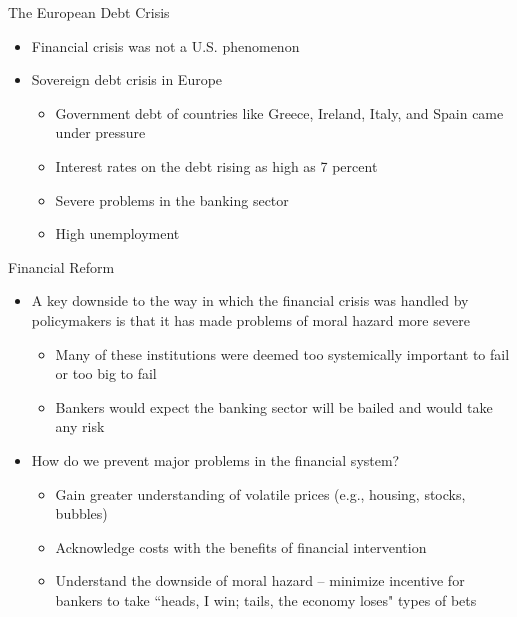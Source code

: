 \documentclass[aspectratio=1610]{beamer}
\begin{document}
\begin{frame}[wide]{The European Debt Crisis}
	\begin{itemize}
		\item Financial crisis was not a U.S. phenomenon
		\item Sovereign debt crisis in Europe
		\begin{itemize}
			\item Government debt of countries like Greece, Ireland, Italy, and Spain came under pressure 
			\item Interest rates on the debt rising as high as 7 percent
			\item Severe problems in the banking sector 
			\item High unemployment
			
		\end{itemize}
	\end{itemize}
\end{frame}

\begin{frame}[wide]{Financial Reform}
	\begin{itemize}
		\item A key downside to the way in which the financial crisis was handled by policymakers is that it has made problems of moral hazard more severe
		\begin{itemize}
			\item Many of these institutions were deemed too systemically important to fail or too big to fail
			\item Bankers would expect the banking sector will be bailed and would take any risk
		\end{itemize}
		\item How do we prevent major problems in the financial system?
		\begin{itemize}
			\item Gain greater understanding of volatile prices (e.g., housing, stocks, bubbles)
			\item Acknowledge costs with the benefits of financial intervention
			\item Understand the downside of moral hazard -- minimize incentive for bankers to take ``heads, I win; tails, the economy loses" types of bets
		\end{itemize}
	\end{itemize}
\end{frame}
\end{document}
